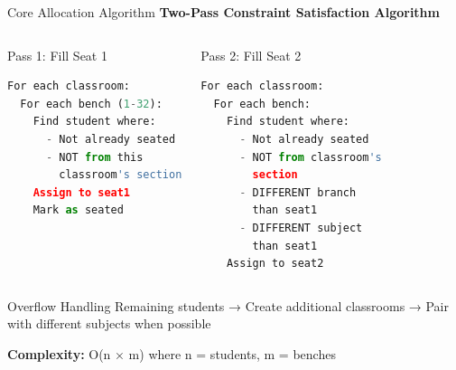 \documentclass[aspectratio=169]{beamer}
\begin{document}
\begin{frame}[fragile]{Core Allocation Algorithm}
\textbf{Two-Pass Constraint Satisfaction Algorithm}

\begin{columns}
\begin{block}{Pass 1: Fill Seat 1}
\begin{lstlisting}[language=Python, basicstyle=\tiny]
For each classroom:
  For each bench (1-32):
    Find student where:
      - Not already seated
      - NOT from this 
        classroom's section
    Assign to seat1
    Mark as seated
\end{lstlisting}
\end{block}

\begin{block}{Pass 2: Fill Seat 2}
\begin{lstlisting}[language=Python, basicstyle=\tiny]
For each classroom:
  For each bench:
    Find student where:
      - Not already seated
      - NOT from classroom's 
        section
      - DIFFERENT branch 
        than seat1
      - DIFFERENT subject 
        than seat1
    Assign to seat2
\end{lstlisting}
\end{block}
\end{columns}

\vspace{0.3cm}
\begin{alertblock}{Overflow Handling}
Remaining students → Create additional classrooms → Pair with different subjects when possible
\end{alertblock}

\textbf{Complexity:} O(n × m) where n = students, m = benches
\end{frame}
\end{document}
